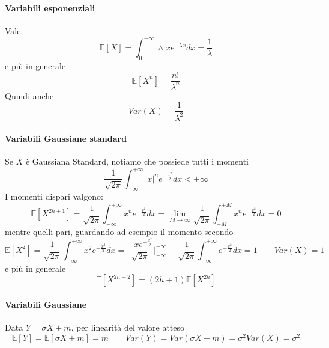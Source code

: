 \paragraph{Variabili esponenziali}
Vale:
\begin{equation}
	\mathbb{E}[X] = \int_{0}^{+\infty}\land x e^{-\lambda x}dx=\frac{1}{\lambda}
\end{equation}
e più in generale
\begin{equation}
	\mathbb{E}[X^n]=\frac{n!}{\lambda^n}
\end{equation}
Quindi anche
\begin{equation}
	Var(X) = \frac{1}{\lambda^2}
\end{equation}

\paragraph{Variabili Gaussiane standard}
Se $X$ è Gaussiana Standard, notiamo che possiede tutti i momenti
\begin{equation}
	\frac{1}{\sqrt{2\pi}}\int_{-\infty}^{+\infty}\lvert x\rvert^ne^{-\frac{x^2}{2}} dx < +\infty
\end{equation}
I momenti dispari valgono:
\begin{equation}
	\mathbb{E}[X^{2h+1}] = \frac{1}{\sqrt{2\pi}}\int_{-\infty}^{+\infty}x^ne^{-\frac{x^2}{2}}dx = \lim_{M \to \infty}\frac{1}{\sqrt{2\pi}}\int_{-M}^{+M}x^ne^{-\frac{x^2}{2}}dx=0
\end{equation}
mentre quelli pari, guardando ad esempio il momento secondo
\begin{equation}
	\mathbb{E}[X^2]=\frac{1}{\sqrt{2\pi}}\int_{-\infty}^{+\infty}x^2e^{-\frac{x^2}{2}}dx = \frac{-xe^{-\frac{x^2}{2}}}{\sqrt{2\pi}}\bigg\vert^{+\infty}_{-\infty}+\frac{1}{\sqrt{2\pi}}\int_{-\infty}^{+\infty}e^{-\frac{x^2}{2}}dx = 1 \quad\quad Var(X)=1
\end{equation}
e più in generale
\begin{equation}
	\mathbb{E}[X^{2h+2}]=(2h+1)\mathbb{E}[X^{2h}]
\end{equation}

\paragraph{Variabili Gaussiane}
Data $Y=\sigma X + m$, per linearità del valore atteso
\begin{equation}
	\mathbb{E}[Y] = \mathbb{E}[\sigma X + m] = m \quad\quad Var(Y)=Var(\sigma X +m)=\sigma^2Var(X) = \sigma^2
\end{equation}

